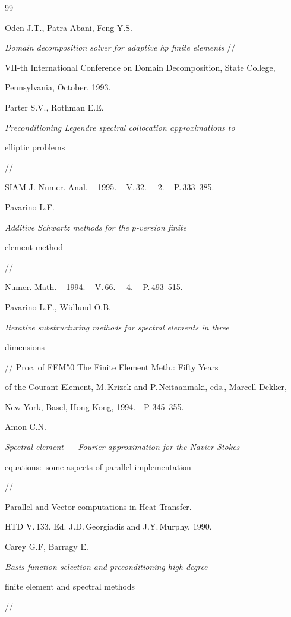 \begin{thebibliography}{99}


Oden J.T., Patra Abani, Feng Y.S.


{\it Domain decomposition solver for adaptive hp finite elements} //


VII-th International Conference on Domain Decomposition, State College,


Pennsylvania, October, 1993.




Parter S.V., Rothman E.E.


{\it Preconditioning Legendre spectral collocation approximations to


elliptic problems} //


SIAM J. Numer. Anal. -- 1995. -- V.\,32. -- \No\,2. -- P.\,333--385.




Pavarino L.F.


{\it Additive Schwartz methods for the $p$-version finite


element method} //


Numer. Math. -- 1994. -- V.\,66. -- \No\,4. -- P.\,493--515.




Pavarino L.F., Widlund O.B.


{\it Iterative substructuring methods for spectral elements in three


dimensions} // Proc. of FEM50 The Finite Element Meth.: Fifty Years


of the Courant Element, M.\,Krizek and P.\,Neitaanmaki, eds., Marcell Dekker,


New York, Basel, Hong Kong, 1994. - P.\,345--355.




Amon C.N.


{\it Spectral element --- Fourier approximation for the Navier-Stokes


equations$:$ some aspects of parallel implementation} //


Parallel and Vector computations in Heat Transfer.


HTD V.\,133. Ed. J.D.\,Georgiadis and J.Y.\,Murphy, 1990.




Carey G.F, Barragy E.


{\it Basis function selection and preconditioning high degree


finite element and spectral methods} //



\end{thebibliography}
